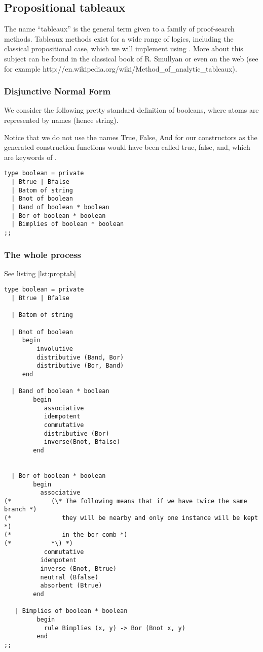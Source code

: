 \documentclass{article}
\begin{document}
\subsection{Propositional tableaux}
\label{sec:proptab}

The name ``tableaux'' is the general term given to a 
family of proof-search methods. Tableaux methods exist for a wide
range of logics, including the classical propositional case, which we
will implement using \moca. More about this subject can be found in
the classical book \cite{Smu68} of R. Smullyan or even on the web (see
for example {\sf http://en.wikipedia.org/wiki/Method\_of\_analytic\_tableaux}).

\subsubsection{Disjunctive Normal Form}
We consider the following pretty standard definition of booleans,
where atoms are represented by names (hence {\sf string}).

Notice that we do not use the names {\sf True, False, And} for our
constructors as
the generated construction functions would have been called 
{\sf true, false, and}, which are keywords of \ocaml.

\begin{lstlisting}
type boolean = private
  | Btrue | Bfalse
  | Batom of string
  | Bnot of boolean
  | Band of boolean * boolean
  | Bor of boolean * boolean
  | Bimplies of boolean * boolean 
;;
\end{lstlisting}

\subsubsection{The whole process}
See listing \ref{lst:proptab}
\begin{lstlisting}[float, caption={Propositional tableaux}, label={lst:proptab}]
 type boolean = private
  | Btrue | Bfalse
   
  | Batom of string
 
  | Bnot of boolean
     begin 
         involutive 
         distributive (Band, Bor) 
         distributive (Bor, Band) 
     end 

  | Band of boolean * boolean
        begin
           associative 
           idempotent 
           commutative 
           distributive (Bor) 
           inverse(Bnot, Bfalse)
        end


  | Bor of boolean * boolean
        begin
          associative  
(*           (\* The following means that if we have twice the same branch *)
(*              they will be nearby and only one instance will be kept *)
(*              in the bor comb *)
(*           *\) *)
           commutative 
          idempotent
          inverse (Bnot, Btrue)
          neutral (Bfalse)
          absorbent (Btrue)
        end

   | Bimplies of boolean * boolean 
         begin 
           rule Bimplies (x, y) -> Bor (Bnot x, y) 
         end
;;

\end{lstlisting}
\end{document}
